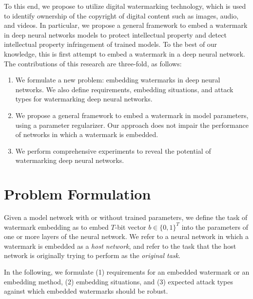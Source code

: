 \documentclass[10pt,twocolumn,letterpaper]{article}
\begin{document}
To this end, we propose to utilize digital watermarking technology, which is used to identify ownership of the copyright of digital content such as images, audio, and videos.
In particular, we propose a general framework to embed a watermark in deep neural networks models to protect intellectual property and detect intellectual property infringement of trained models.
To the best of our knowledge, this is first attempt to embed a watermark in a deep neural network.
The contributions of this research are three-fold, as follows:
\begin{enumerate}
\item We formulate a new problem: embedding watermarks in deep neural networks.
We also define requirements, embedding situations, and attack types for watermarking deep neural networks.
\item We propose a general framework to embed a watermark in model parameters, using a parameter regularizer.
Our approach does not impair the performance of networks in which a watermark is embedded.
\item We perform comprehensive experiments to reveal the potential of watermarking deep neural networks.
\end{enumerate}


\section{Problem Formulation}
Given a model network with or without trained parameters, we define the task of watermark embedding as to embed $T$-bit vector $b \in \{0, 1\}^{T}$ into the parameters of one or more layers of the neural network.
We refer to a neural network in which a watermark is embedded as a \textit{host network}, and refer to the task that the host network is originally trying to perform as the \textit{original task}.

In the following, we formulate (1) requirements for an embedded watermark or an embedding method, (2) embedding situations, and (3) expected attack types against which embedded watermarks should be robust.
\end{document}
